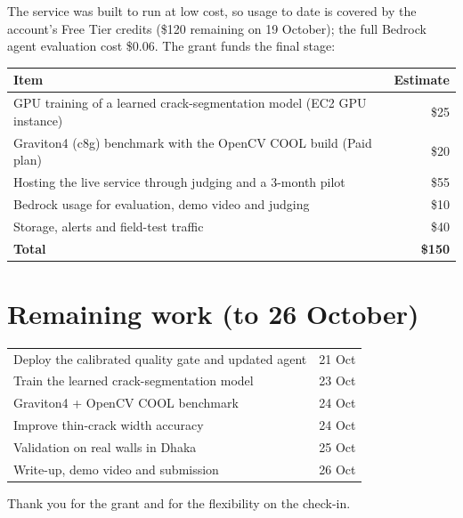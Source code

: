 \documentclass[11pt,a4paper]{article}
\begin{document}
The service was built to run at low cost, so usage to date is covered by the account's Free Tier credits (\$120 remaining on 19 October); the full Bedrock agent evaluation cost \$0.06. The grant funds the final stage:

\begin{center}
\begin{tabularx}{0.92\textwidth}{Xr}
\toprule
Item & Estimate \\
\midrule
GPU training of a learned crack-segmentation model (EC2 GPU instance) & \$25 \\
Graviton4 (c8g) benchmark with the OpenCV COOL build (Paid plan) & \$20 \\
Hosting the live service through judging and a 3-month pilot & \$55 \\
Bedrock usage for evaluation, demo video and judging & \$10 \\
Storage, alerts and field-test traffic & \$40 \\
\midrule
\textbf{Total} & \textbf{\$150} \\
\bottomrule
\end{tabularx}
\end{center}

\section{Remaining work (to 26 October)}
\begin{center}
\begin{tabularx}{0.92\textwidth}{Xr}
\toprule
Deploy the calibrated quality gate and updated agent & 21 Oct \\
Train the learned crack-segmentation model & 23 Oct \\
Graviton4 + OpenCV COOL benchmark & 24 Oct \\
Improve thin-crack width accuracy & 24 Oct \\
Validation on real walls in Dhaka & 25 Oct \\
Write-up, demo video and submission & 26 Oct \\
\bottomrule
\end{tabularx}
\end{center}

Thank you for the grant and for the flexibility on the check-in.
\end{document}
